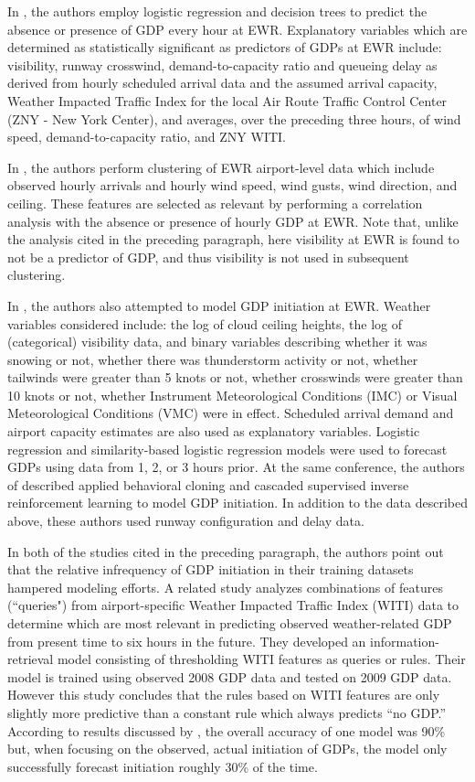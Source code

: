 \documentclass[11pt]{scrartcl}
\begin{document}
In \cite{mukherjeepredicting}, the authors employ logistic regression and decision trees to predict the absence or presence of GDP every hour at EWR.  Explanatory variables which are determined as statistically significant as predictors of GDPs at EWR include: visibility, runway crosswind, demand-to-capacity ratio and queueing delay as derived from hourly scheduled arrival data and the assumed arrival capacity, Weather Impacted Traffic Index for the local Air Route Traffic Control Center (ZNY - New York Center), and averages, over the preceding three hours, of wind speed, demand-to-capacity ratio, and ZNY WITI.

In \cite{grabbe2013similar}, the authors perform clustering of EWR airport-level data which include observed hourly arrivals and hourly wind speed, wind gusts, wind direction, and ceiling.  These features are selected as relevant by performing a correlation analysis with the absence or presence of hourly GDP at EWR.  Note that, unlike the analysis cited in the preceding paragraph, here visibility at EWR is found to not be a predictor of GDP, and thus visibility is not used in subsequent clustering.

In \cite{Hansen_informs}, the authors also attempted to model GDP initiation at EWR. Weather variables considered include: the log of cloud ceiling heights, the log of (categorical) visibility data, and binary variables describing whether it was snowing or not, whether there was thunderstorm activity or not, whether tailwinds were greater than 5 knots or not, whether crosswinds were greater than 10 knots or not, whether Instrument Meteorological Conditions (IMC) or Visual Meteorological Conditions (VMC) were in effect.  Scheduled arrival demand and airport capacity estimates are also used as explanatory variables.  Logistic regression and similarity-based logistic regression models were used to forecast GDPs using data from 1, 2, or 3 hours prior.  At the same conference, the authors of \cite{Bloem_informs} described applied behavioral cloning and cascaded supervised inverse reinforcement learning to model GDP initiation.  In addition to the data described above, these authors used runway configuration and delay data.

In both of the studies cited in the preceding paragraph, the authors point out that the relative infrequency of GDP initiation in their training datasets hampered modeling efforts.  A related study \cite{wolfe2011method} analyzes combinations of features (``queries") from airport-specific Weather Impacted Traffic Index (WITI) data to determine which are most relevant in predicting observed weather-related GDP from present time to six hours in the future.  They developed an information-retrieval model consisting of thresholding WITI features as queries or rules.  Their model is trained using observed 2008 GDP data and tested on 2009 GDP data.  However this study concludes that the rules based on WITI features are only slightly more predictive than a constant rule which always predicts ``no GDP.''   According to results discussed by \cite{Hansen_informs}, the overall accuracy of one model was 90\% but, when focusing on the observed, actual initiation of GDPs, the model only successfully forecast initiation roughly 30\% of the time.
\end{document}
